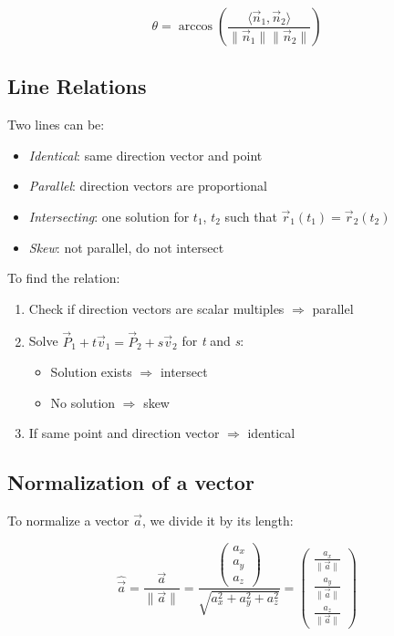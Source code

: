 \[
	\theta = \arccos\left( \frac{\langle\vec{n}_1, \vec{n}_2\rangle}{\|\vec{n}_1\|\|\vec{n}_2\|} \right)
\]

\subsection{Line Relations}

Two lines can be:

\begin{itemize}
	\item \emph{Identical}: same direction vector and point
	\item \emph{Parallel}: direction vectors are proportional
	\item \emph{Intersecting}: one solution for \(t_1\), \(t_2\) such that \(\vec{r}_1(t_1) = \vec{r}_2(t_2)\)
	\item \emph{Skew}: not parallel, do not intersect
\end{itemize}

To find the relation:

\begin{enumerate}
	\item Check if direction vectors are scalar multiples \(\Rightarrow\) parallel
	\item Solve \(\vec{P}_1 + t\vec{v}_1 = \vec{P}_2 + s\vec{v}_2\) for \emph{t} and \emph{s}:
	      \begin{itemize}
		      \item Solution exists \(\Rightarrow\) intersect
		      \item No solution \(\Rightarrow\) skew
	      \end{itemize}
	\item If same point and direction vector \(\Rightarrow\) identical
\end{enumerate}

\subsection{Normalization of a vector}

To normalize a vector \(\vec{a}\), we divide it by its length:

\[
	\hat{\vec{a}} = \frac{\vec{a}}{\|\vec{a}\|} = \frac{\begin{pmatrix} a_x \\ a_y \\ a_z \end{pmatrix}}{\sqrt{a_x^2 + a_y^2 + a_z^2}} = \begin{pmatrix} \frac{a_x}{\|\vec{a}\|} \\ \frac{a_y}{\|\vec{a}\|} \\ \frac{a_z}{\|\vec{a}\|} \end{pmatrix}
\]

